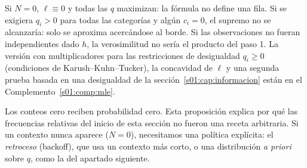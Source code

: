 \begin{observacion}
Si $N=0$, $\ell\equiv0$ y todas las $q$ maximizan: la fórmula no define una fila.
Si se exigiera $q_i>0$ para todas las categorías y algún $c_i=0$, el supremo no se
alcanzaría: solo se aproxima acercándose al borde. Si las observaciones no fueran
independientes dado $h$, la verosimilitud no sería el producto del paso 1. La
versión con multiplicadores para las restricciones de desigualdad $q_i\ge0$
(condiciones de Karush--Kuhn--Tucker), la concavidad de $\ell$ y una segunda
prueba basada en una desigualdad de la sección~\ref{s01:cap:informacion} están en el Complemento~\ref{s01:comp:mle}.
\end{observacion}
Los conteos cero reciben probabilidad cero. Esta proposición explica por qué las
frecuencias relativas del inicio de esta sección no fueron una receta
arbitraria. Si un contexto nunca aparece ($N=0$), necesitamos una política
explícita: el \emph{retroceso} (backoff), que usa un contexto más corto, o una
distribución \emph{a priori} sobre $q$, como la del apartado siguiente.
